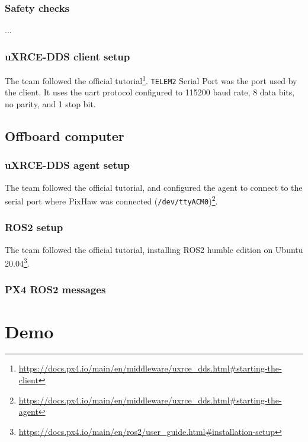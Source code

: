 \documentclass[a4paper]{article}
\begin{document}
\subsubsection{Safety checks}

...

\subsubsection{uXRCE-DDS client setup}

The team followed the official tutorial\footnote{\url{https://docs.px4.io/main/en/middleware/uxrce_dds.html\#starting-the-client}}. 
\verb|TELEM2| Serial Port was the port used by the client. It uses the uart protocol configured to 115200 baud rate, 8 data bits, no parity, and 1 stop bit. 

\subsection{Offboard computer}

\subsubsection{uXRCE-DDS agent setup}

The team followed the official tutorial, and configured the agent to connect to the serial port where PixHaw was connected (\verb|/dev/ttyACM0|)\footnote{\url{https://docs.px4.io/main/en/middleware/uxrce_dds.html\#starting-the-agent}}. 

\subsubsection{ROS2 setup}

The team followed the official tutorial, installing ROS2 humble edition on Ubuntu 20.04\footnote{\url{https://docs.px4.io/main/en/ros2/user_guide.html\#installation-setup}}. 

\subsubsection{PX4 ROS2 messages}




\clearpage
\section{Demo}
\label{sec::demo}
\end{document}
